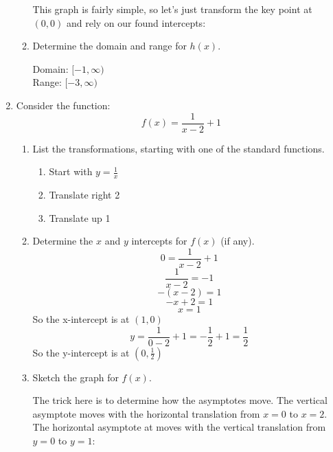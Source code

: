 \documentclass[letterpaper,12pt,fleqn]{article}
\begin{document}
\begin{enumerate}
\begin{enumerate}
    This graph is fairly simple, so let's just transform the key point at
    $(0,0)$ and rely on our found intercepts:
    
    
  \item Determine the domain and range for $h(x)$.

    Domain: $[-1,\infty)$ \\
    Range: $[-3,\infty)$
  \end{enumerate}

\item Consider the function:
  \[f(x)=\frac{1}{x-2} + 1\]
  \begin{enumerate}
  \item List the transformations, starting with one of the standard
    functions.

    \begin{enumerate}[label={\arabic*)}]
    \item Start with $y=\frac{1}{x}$
    \item Translate right 2
    \item Translate up 1
    \end{enumerate}

  \item Determine the $x$ and $y$ intercepts for $f(x)$ (if any).
    \[0=\frac{1}{x-2}+1\]
    \[\frac{1}{x-2}=-1\]
    \[-(x-2)=1\]
    \[-x+2=1\]
    \[x=1\]
    So the x-intercept is at $(1,0)$
    \[y=\frac{1}{0-2}+1=-\frac{1}{2}+1=\frac{1}{2}\]
    So the y-intercept is at $\left(0,\frac{1}{2}\right)$
    
  \item Sketch the graph for $f(x)$.

    The trick here is to determine how the asymptotes move. The vertical
    asymptote moves with the horizontal translation from $x=0$ to $x=2$.
    The horizontal asymptote at moves with the vertical translation from
    $y=0$ to $y=1$:
    

\end{enumerate}
\end{enumerate}
\end{document}

